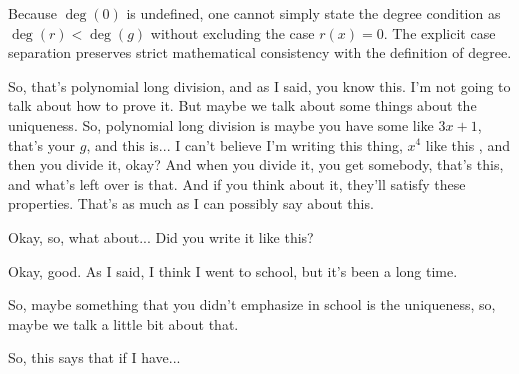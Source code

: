 \begin{content}

\begin{steps}
Because $\deg(0)$ is undefined, one cannot simply state the degree condition as $\deg(r) < \deg(g)$ without excluding the case $r(x) = 0$. The explicit case separation  preserves strict mathematical consistency with the definition of degree.
\end{steps}
\end{content}

\begin{hidden}
\end{hidden}

\begin{speech}[00:29:16 - 00:30:46]
So, that's polynomial long division, and as I said, you know this. I'm not going to talk about how to prove it. But maybe we talk about some things about the uniqueness. So, polynomial long division is maybe you have some like $3x + 1$, that's your $g$, and this is... I can't believe I'm writing this thing, $x^4$ like this , and then you divide it, okay? And when you divide it, you get somebody, that's this, and what's left over is that. And if you think about it, they'll satisfy these properties. That's as much as I can possibly say about this.

Okay, so, what about... Did you write it like this?

Okay, good. As I said, I think I went to school, but it's been a long time.

So, maybe something that you didn't emphasize in school is the uniqueness, so, maybe we talk a little bit about that.

So, this says that if I have... 
\end{speech}

